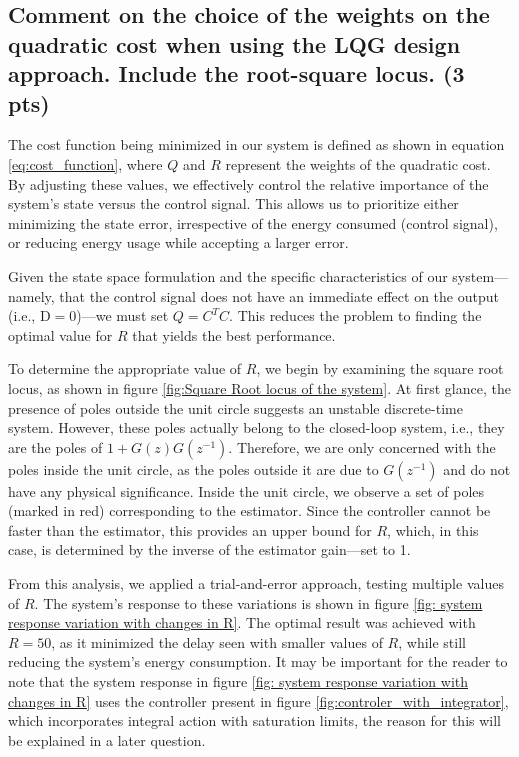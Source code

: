 \subsection{Comment on the choice of the weights on the quadratic cost when using the LQG design approach. Include the root-square locus. (3 pts)}
\vspace{10pt}


The cost function being minimized in our system is defined as shown in equation \ref{eq:cost_function}, where $Q$ and $R$ represent the weights of the quadratic cost. By adjusting these values, we effectively control the relative importance of the system's state versus the control signal. This allows us to prioritize either minimizing the state error, irrespective of the energy consumed (control signal), or reducing energy usage while accepting a larger error.

Given the state space formulation and the specific characteristics of our system—namely, that the control signal does not have an immediate effect on the output (i.e., $\text{D} = 0$)—we must set $Q = C^{T}C$. This reduces the problem to finding the optimal value for $R$ that yields the best performance.

To determine the appropriate value of $R$, we begin by examining the square root locus, as shown in figure \ref{fig:Square Root locus of the system}. At first glance, the presence of poles outside the unit circle suggests an unstable discrete-time system. However, these poles actually belong to the closed-loop system, i.e., they are the poles of $1 + G(z)G(z^{-1})$. Therefore, we are only concerned with the poles inside the unit circle, as the poles outside it are due to $G(z^{-1})$ and do not have any physical significance. Inside the unit circle, we observe a set of poles (marked in red) corresponding to the estimator. Since the controller cannot be faster than the estimator, this provides an upper bound for $R$, which, in this case, is determined by the inverse of the estimator gain—set to 1.

From this analysis, we applied a trial-and-error approach, testing multiple values of $R$. The system's response to these variations is shown in figure \ref{fig: system response variation with changes in R}. The optimal result was achieved with $R = 50$, as it minimized the delay seen with smaller values of $R$, while still reducing the system's energy consumption. It may be important for the reader to note that the system response in figure  \ref{fig: system response variation with changes in R} uses the controller present in figure \ref{fig:controler_with_integrator}, which incorporates integral action with saturation limits, the reason for this will be explained in a later question.

